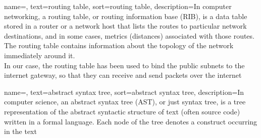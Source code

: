 {
    name=,
    text=routing table,
    sort=routing table,
    description={In computer networking, a routing table, or routing information base (RIB), is a data table stored in a router or a network host that lists the routes to particular network destinations, and in some cases, metrics (distances) associated with those routes. The routing table contains information about the topology of the network immediately around it.\\
    In our case, the routing table has been used to bind the public subnets to the internet gateway, so that they can receive and send packets over the internet}
}

{
    name=,
    text=abstract syntax tree,
    sort=abstract syntax tree,
    description={In computer science, an abstract syntax tree (AST), or just syntax tree, is a tree representation of the abstract syntactic structure of text (often source code) written in a formal language. Each node of the tree denotes a construct occurring in the text}
}